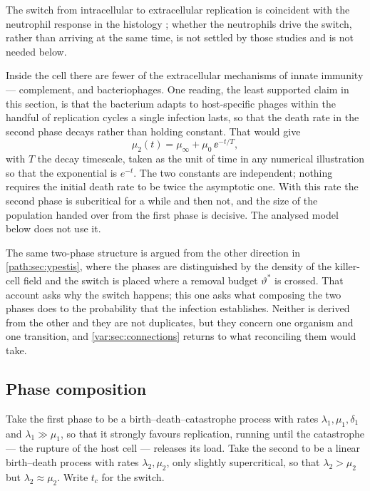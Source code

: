 The switch from intracellular to extracellular replication is coincident
with the neutrophil response in the histology
\cite{BosioEtAl2005,PetersEtAl2013}; whether the neutrophils drive the
switch, rather than arriving at the same time, is not settled by those
studies and is not needed below.

\begin{remark}
\label{var:rem:mudecay}
Inside the cell there are fewer of the extracellular mechanisms of innate
immunity --- complement, and bacteriophages. One reading, the least supported
claim in this section, is that the bacterium adapts to host-specific phages
within the handful of replication cycles a single infection lasts, so that
the death rate in the second phase decays rather than holding constant. That
would give
\begin{equation}
\mu_2(t)=\mu_\infty+\mu_0\,\ee^{-t/T},
\label{var:eq:mudecay}
\end{equation}
with $T$ the decay timescale, taken as the unit of time in any numerical
illustration so that the exponential is $e^{-t}$. The two constants are
independent; nothing requires the initial death rate to be twice the
asymptotic one. With this rate the second phase is subcritical for a while
and then not, and the size of the population handed over from the first phase
is decisive. The analysed model below does not use it.
\end{remark}

The same two-phase structure is argued from the other direction in
\cref{path:sec:ypestis}, where the phases are distinguished by the density of
the killer-cell field and the switch is placed where a removal budget
$\vartheta^{\ast}$ is crossed. That account asks why the switch happens;
this one asks what composing the two phases does to the probability that the
infection establishes. Neither is derived from the other and they are not
duplicates, but they concern one organism and one transition, and
\cref{var:sec:connections} returns to what reconciling them would take.

\subsection{Phase composition}
\label{var:sec:composition}

Take the first phase to be a birth--death--catastrophe process with rates
$\lambda_1,\mu_1,\delta_1$ and $\lambda_1\gg\mu_1$, so that it strongly
favours replication, running until the catastrophe --- the rupture of the
host cell --- releases its load. Take the second to be a linear birth--death
process with rates $\lambda_2,\mu_2$, only slightly supercritical, so that
$\lambda_2>\mu_2$ but $\lambda_2\approx\mu_2$. Write $t_c$ for the switch.

